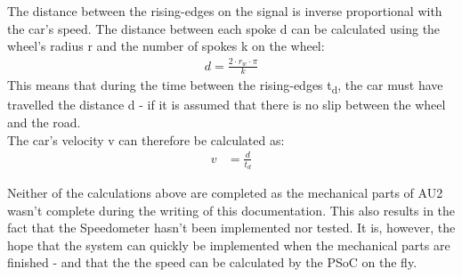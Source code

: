 \newpage
The distance between the rising-edges on the signal is inverse proportional with the car's speed. The distance between each spoke d can be calculated using the wheel's radius r and the number of spokes k on the wheel:
\begin{align}
		d = \frac{2 \cdot r_w \cdot \pi}{k}
\end{align}
This means that during the time between the rising-edges t\textsubscript{d}, the car must have travelled the distance d - if it is assumed that there is no slip between the wheel and the road.\\
The car's velocity v can therefore be calculated as:
\begin{align}
		v &= \frac{d}{t_d}
\end{align}

Neither of the calculations above are completed as the mechanical parts of AU2 wasn't complete during the writing of this documentation. This also results in the fact that the Speedometer hasn't been implemented nor tested. It is, however, the hope that the system can quickly be implemented when the mechanical parts are finished - and that the the speed can be calculated by the PSoC on the fly. 